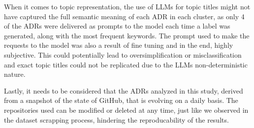     When it comes to topic representation, the use of LLMs for topic titles might not have captured the full semantic meaning of each ADR in each cluster, as only 4 of the ADRs were delivered as prompts to the model each time a label was generated, along with the most frequent keywords. The prompt used to make the requests to the model was also a result of fine tuning and in the end, highly subjective. This could potentially lead to oversimplification or misclassification and exact topic titles could not be replicated due to the LLMs non-deterministic nature.
    
    Lastly, it needs to be considered that the ADRs analyzed in this study, derived from a snapshot of the state of GitHub, that is evolving on a daily basis. The repositories used can be modified or deleted at any time, just like we observed in the dataset scrapping process, hindering the reproducability of the results.